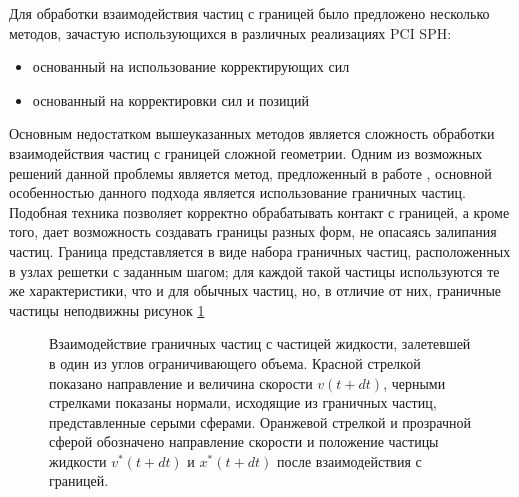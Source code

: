 Для обработки взаимодействия частиц с границей было предложено несколько методов, зачастую использующихся в различных реализациях PCI SPH:

\begin{itemize}
    \item основанный на использование корректирующих сил \cite {Müller2004}
    \item основанный на корректировки сил и позиций \cite {Becker2009}
\end{itemize}

Основным недостатком вышеуказанных методов является сложность обработки взаимодействия частиц с границей сложной геометрии. Одним из возможных решений данной проблемы является метод, предложенный в работе  \cite {Ihmsen2010}, основной особенностью данного подхода является использование граничных частиц. Подобная техника позволяет корректно обрабатывать контакт с границей, а кроме того, дает возможность создавать границы разных форм, не опасаясь залипания частиц. Граница представляется в виде набора граничных частиц, расположенных в узлах решетки с заданным шагом; для каждой такой частицы используются те же характеристики, что и для обычных частиц, но, в отличие от них, граничные частицы неподвижны рисунок \ref{fig:boundary}
\begin{figure}[ht]
    \caption{Взаимодействие граничных частиц с частицей жидкости, залетевшей в один из углов ограничивающего объема. Красной стрелкой показано направление и величина скорости \(v(t+dt)\), черными стрелками показаны нормали, исходящие из граничных частиц, представленные серыми сферами. Оранжевой стрелкой и прозрачной сферой обозначено направление скорости и положение частицы жидкости \(v^{*}(t+dt)\) и \(x^{*}(t+dt)\) после взаимодействия с границей.}
    \label{fig:boundary}
\end{figure}

